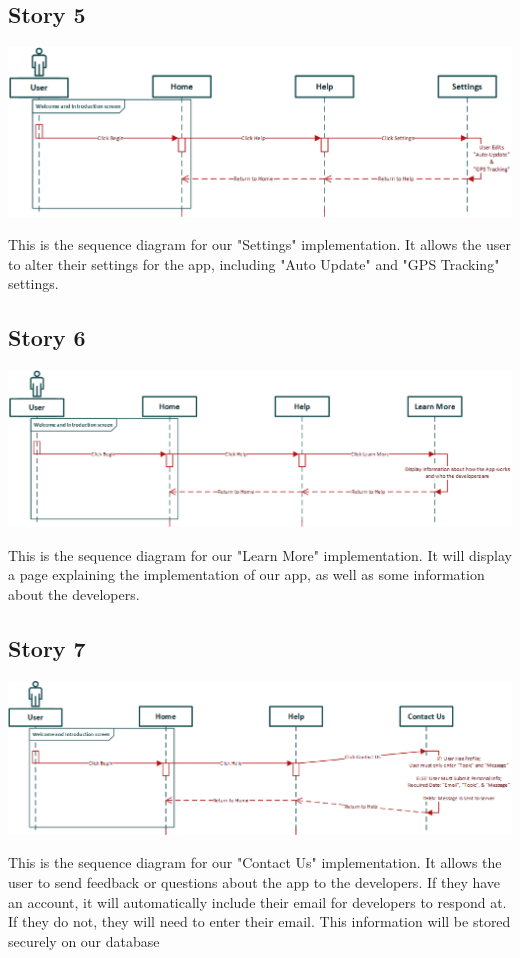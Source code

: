 \documentclass[a4paper]{article}
\begin{document}
\subsection{Story 5}
\begin{center}\includegraphics[scale=.7]{Story5.eps}\end{center}
This is the sequence diagram for our "Settings" implementation. It allows the user to alter their settings for the app, including "Auto Update" and "GPS Tracking" settings.
\subsection{Story 6}
\begin{center}\includegraphics[scale=.65]{Story6.eps}\end{center}
This is the sequence diagram for our "Learn More" implementation. It will display a page explaining the implementation of our app, as well as some information about the developers.
\pagebreak
\subsection{Story 7}
\begin{center}\includegraphics[scale=.65]{Story7.eps}\end{center}
This is the sequence diagram for our "Contact Us" implementation. It allows the user to send feedback or questions about the app to the developers. If they have an account, it will automatically include their email for developers to respond at. If they do not, they will need to enter their email. This information will be stored securely on our database
\end{document}
